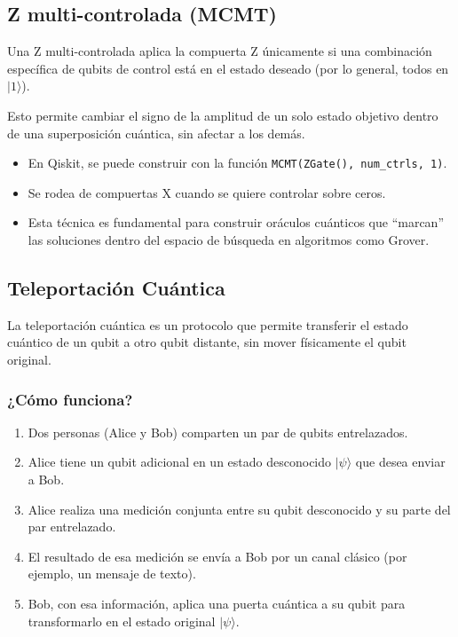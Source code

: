 \documentclass{article}
\begin{document}
\subsection*{Z multi-controlada (MCMT)}

Una Z multi-controlada aplica la compuerta Z únicamente si una combinación específica 
de qubits de control está en el estado deseado (por lo general, todos en \(|1\rangle\)).

Esto permite cambiar el signo de la amplitud de un solo estado objetivo dentro de una 
superposición cuántica, sin afectar a los demás.

\begin{itemize}
    \item En Qiskit, se puede construir con la función \texttt{MCMT(ZGate(), num\_ctrls, 1)}.
    \item Se rodea de compuertas X cuando se quiere controlar sobre ceros.
    \item Esta técnica es fundamental para construir oráculos cuánticos que ``marcan'' 
            las soluciones dentro del espacio de búsqueda en algoritmos como Grover.
\end{itemize}

\subsection*{Teleportación Cuántica}

La teleportación cuántica es un protocolo que permite transferir el estado cuántico de un qubit a otro qubit distante, sin mover físicamente el qubit original.

\subsubsection*{¿Cómo funciona?}

\begin{enumerate}
    \item Dos personas (Alice y Bob) comparten un par de qubits entrelazados.
    \item Alice tiene un qubit adicional en un estado desconocido $\vert \psi \rangle$ que desea enviar a Bob.
    \item Alice realiza una medición conjunta entre su qubit desconocido y su parte del par entrelazado.
    \item El resultado de esa medición se envía a Bob por un canal clásico (por ejemplo, un mensaje de texto).
    \item Bob, con esa información, aplica una puerta cuántica a su qubit para transformarlo en el estado original $\vert \psi \rangle$.
\end{enumerate}
\end{document}
